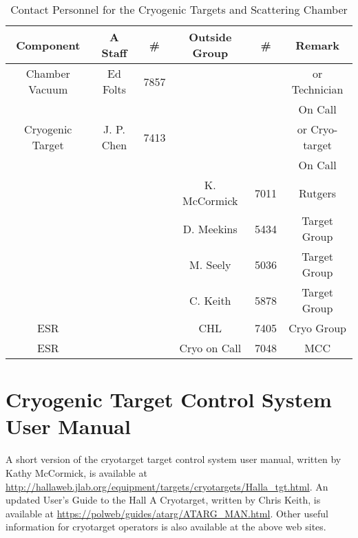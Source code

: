 {\vspace{0.3cm} { \centering 
\begin{table}
\begin{tabular}{|c|c|c|c|c|c|}
\hline 
Component &
 A Staff&
 \#&
 Outside Group&
 \#&
 Remark\\
\hline 
Chamber Vacuum&
 Ed Folts&
 7857&
&
&
 or Technician \\
&
&
&
&
&
 On Call\\
\hline 
Cryogenic Target &
J. P. Chen
&7413 &
&
&
 or Cryo-target \\
&
&
&
&
&
On Call 
\\
\hline 
&
&
&
 K. McCormick&
 7011&
 Rutgers\\
\hline 
&
&
&
 D. Meekins&
 5434&
 Target Group\\
\hline 
&
&
&
 M. Seely&
 5036&
 Target Group\\
\hline 
&
&
&
 C. Keith&
 5878&
 Target Group\\
\hline 
ESR&
&
&
 CHL&
 7405&
 Cryo Group\\
\hline 
ESR&
&
&
 Cryo on Call&
 7048&MCC
\\
\hline 
\end{tabular}
\label{tab:tarper}

\caption{Contact Personnel for the Cryogenic Targets and Scattering Chamber}
\end{table}
}

\par{} \vspace{0.3cm}
}
\section[Cryogenic Target Control System User Manual]
{Cryogenic Target Control System User Manual 
}
A short version of 
the cryotarget target control system user manual, written by Kathy 
McCormick, is available at
\url{http://hallaweb.jlab.org/equipment/targets/cryotargets/Halla_tgt.html}.
An updated User's Guide to the Hall A Cryotarget, written by Chris Keith,
is available at \url{https://polweb/guides/atarg/ATARG_MAN.html}.  Other useful
information for cryotarget operators 
is also available at the above web sites.



